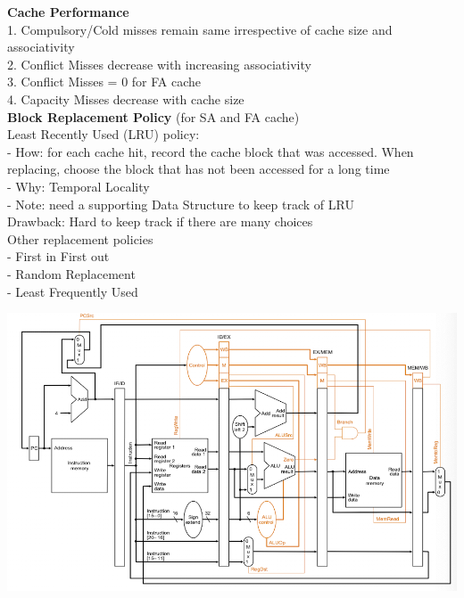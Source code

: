 \documentclass[10pt, a4paper]{article}
\newcommand{\blue}[1]{{\color{MidnightBlue}#1}}
\newcommand{\red}[1]{{\color{red}#1}}
\begin{document}
\begin{multicols*}{3}
		\textbf{Cache Performance}\\
		1. Compulsory/Cold misses remain same irrespective of cache size and associativity\\
		2. Conflict Misses decrease with increasing associativity\\
		3. Conflict Misses = 0 for FA cache\\
		4. Capacity Misses decrease with cache size\\

		\textbf{Block Replacement Policy} (for SA and FA cache)\\
		Least Recently Used (LRU) policy:\\
		- \blue{How}: for each cache hit, record the cache block that was accessed. When replacing, choose the block that has not been accessed for a long time\\
		- \blue{Why}: Temporal Locality\\
		- Note: need a supporting Data Structure to keep track of LRU\\
		\red{Drawback}: Hard to keep track if there are many choices\\

		Other replacement policies\\
		- First in First out\\
		- Random Replacement\\
		- Least Frequently Used\\













		
		
		
		
		
				
		
		
		

		
		
				
	\end{multicols*}

	\includegraphics[scale=1.5]{./assets/pipelineDatapath}\\
	
\end{document}
